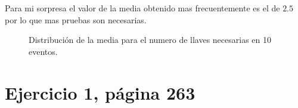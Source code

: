 \documentclass[]{article}
\begin{document}
 Para mi sorpresa el valor de la media obtenido mas frecuentemente es el de $2.5$ por lo que mas pruebas son necesarias.
 \begin{figure}[hbt!]
\centering
{}%
\hfill
{}%
\hfill


\caption{Distribución de la media para el numero de llaves necesarias en 10 eventos.}

\label{fig:casos2}
\end{figure}
     
\section{Ejercicio 1, página 263}
\end{document}
